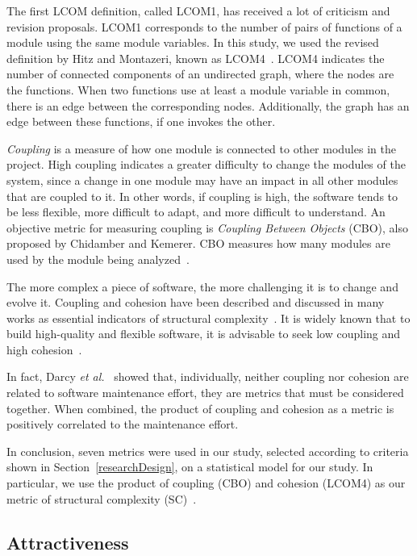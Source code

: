 \documentclass[conference]{IEEEtran}
\newcommand{\TODO}[1]{{\color{red}\textbf{\uwave{#1}}}}
\begin{document}
The first LCOM definition, called LCOM1, has
received a lot of criticism and revision proposals. LCOM1 corresponds to
the number of pairs of functions of a module using the same module variables.
%
In this study, we used the revised definition by Hitz and Montazeri,
known as LCOM4~\cite{LCOM4}.
%
LCOM4 indicates the number of connected components of an undirected graph, where the
nodes are the functions. When two functions use at least a module variable in
common, there is an edge between the corresponding nodes. Additionally, the graph
has an edge between these functions, if one invokes the other.

\emph{Coupling} is a measure of how one module is connected to other modules
in the project.
%
High coupling indicates a greater difficulty to change the
modules of the system, since a change in one module may have an impact in
all other modules that are coupled to it.
%
In other words, if coupling is high, the software tends to be less flexible,
more difficult to adapt, and more difficult to understand.
%
An objective metric for measuring coupling is \emph{Coupling Between Objects} (CBO),
also proposed by Chidamber and Kemerer. CBO measures how many modules are
used by the module being analyzed~\cite{Chidamber94}.

The more complex a piece of software, the more challenging it is to change and
evolve it. Coupling and cohesion have been described and discussed in
many works as essential indicators of structural complexity~\cite{darcy2005}.
%
It is widely known that to build high-quality and flexible software, 
it is advisable to seek low coupling and high cohesion~\cite{richter99}.

In fact, Darcy \emph{et al.}~\cite{darcy2005} showed that, individually, neither
coupling nor cohesion are related to software maintenance effort,
they are metrics that must be considered together. When combined, the
product of coupling and cohesion as a metric is positively correlated to
the maintenance effort.

In conclusion, seven metrics were used in our study, selected according to 
criteria shown in Section~\ref{researchDesign}, on a statistical model for our study.
%
In particular, we use the product of coupling (CBO) and cohesion (LCOM4) as
our metric of structural complexity (SC)~\cite{darcy2005}.

\subsection{Attractiveness} 
\label{attract}
\end{document}
